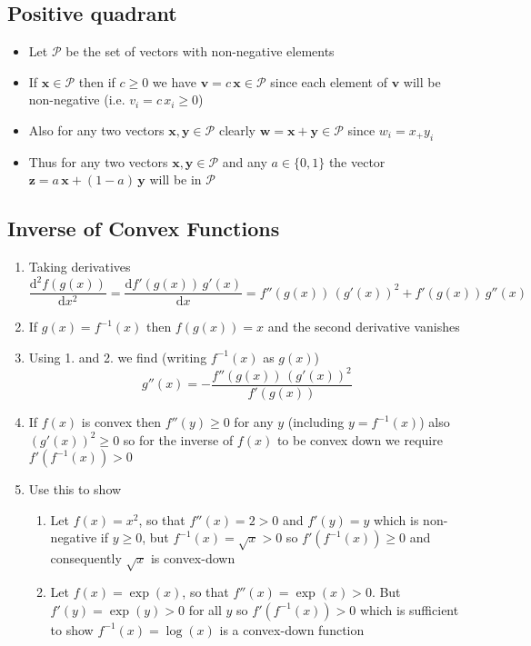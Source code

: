 \documentclass[11pt]{article}
\newcommand{\dd}{\mathrm{d}}
\begin{document}
\subsection{Positive quadrant}
\label{sec:org8293da4}
\begin{itemize}
\item Let \(\mathcal{P}\) be the set of vectors with non-negative elements
\item If \(\bm{x}\in\mathcal{P}\) then if \(c\geq0\) we have
\(\bm{v} = c\,\bm{x}\in\mathcal{P}\) since each element of \(\bm{v}\) will
be non-negative (i.e. \(v_i=c\,x_i\geq0\))
\item Also for any two vectors \(\bm{x},\bm{y}\in\mathcal{P}\) clearly
\(\bm{w} = \bm{x} + \bm{y} \in \mathcal{P}\) since \(w_i=x_+y_i\)
\item Thus for any two vectors  \(\bm{x},\bm{y}\in\mathcal{P}\) and any
\(a\in\{0,1\}\) the vector \(\bm{z} = a\,\bm{x} +(1-a)\,\bm{y}\) will
be in \(\mathcal{P}\)
\end{itemize}

\subsection{Inverse of Convex Functions}
\label{sec:org6d7cd88}
\begin{enumerate}
\item Taking derivatives
$$ \frac{\dd^2 f(g(x))}{\dd x^2} = \frac{\dd
      f'(g(x))\,g'(x)}{\dd x} = f''(g(x))\, (g'(x))^2 + f'(g(x))\,
      g''(x) $$
\item If \(g(x) = f^{-1}(x)\) then \(f(g(x))=x\) and the second derivative vanishes
\item Using 1. and 2. we find (writing \(f^{-1}(x)\) as \(g(x)\))
$$ g''(x) = - \frac{f''(g(x))\, (g'(x))^2}{f'(g(x))} $$
\item If \(f(x)\) is convex then \(f''(y)\geq0\) for any \(y\) (including
\(y=f^{-1}(x)\)) also \((g'(x))^2\geq0\) so for the inverse of
\(f(x)\) to be convex down we require \(f'(f^{-1}(x))>0\)
\item Use this to show
\begin{enumerate}
\item Let \(f(x)=x^2\), so that \(f''(x)=2>0\) and \(f'(y)=y\) which is
non-negative if \(y\geq0\), but \(f^{-1}(x)=\sqrt{x}>0\) so
\(f'(f^{-1}(x))\geq0\) and consequently \(\sqrt{x}\) is
convex-down
\item Let \(f(x)=\exp(x)\), so that \(f''(x) = \exp(x) >0\).  But
\(f'(y) = \exp(y)>0\) for all \(y\) so \(f'(f^{-1}(x))>0\) which is
sufficient to show \(f^{-1}(x)=\log(x)\) is a convex-down
function
\end{enumerate}
\end{enumerate}
\end{document}
